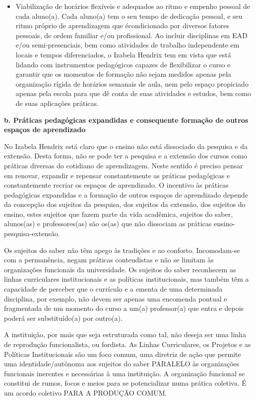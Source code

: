 \documentclass[a4paper, 12pt, openright, oneside, german, french, english, brazil]{abntex2}
\begin{document}
\begin{itemize}
\item Viabilização de horários flexíveis e adequados ao ritmo e empenho pessoal de cada aluno(a). Cada aluno(a) tem o seu tempo de dedicação pessoal, e seu ritmo próprio de aprendizagem que écondicionado por diversos fatores pessoais, de ordem familiar e/ou profissional. Ao incluir disciplinas em EAD e/ou semi-presenciais, bem como atividades de trabalho independente em locais e tempos diferenciados, o Izabela Hendrix tem em vista que está lidando com instrumentos pedagógicos capazes de flexibilizar o curso e garantir que os momentos de formação não sejam medidos apenas pela organização rígida de horários semanais de aula, nem pelo espaço propiciado apenas pela escola para que dê conta de suas atividades e estudos, bem como de suas aplicações práticas.
\end{itemize}

\vspace{5mm}

\textbf{b. Práticas pedagógicas expandidas e consequente formação de outros espaços de aprendizado}

No Izabela Hendrix está claro que o ensino não está dissociado da pesquisa e da extensão. Desta forma, não se pode ter a pesquisa e a extensão dos cursos como práticas diversas do cotidiano de aprendizagem. Neste sentido é preciso pensar em renovar, expandir e repensar constantemente as práticas pedagógicas e constantemente recriar os espaços de aprendizado. O incentivo às práticas pedagógicas expandidas e a formação de outros espaços de aprendizado depende da concepção dos sujeitos da pesquisa, dos sujeitos da extensão, dos sujeitos do ensino, estes sujeitos que fazem parte da vida acadêmica, sujeitos do saber, alunos(as) e professores(as) são os(as) que não dissociam as práticas ensino-pesquisa-extensão.

Os sujeitos do saber não têm apego às tradições e ao conforto. Incomodam-se com a permanência, negam práticas conteudistas e não se limitam às organizações funcionais da universidade. Os sujeitos do saber reconhecem as linhas curriculares institucionais e as políticas institucionais, mas também têm a capacidade de perceber que o currículo e a ementa de uma determinada disciplina, por exemplo, não devem ser apenas uma encomenda pontual e fragmentada de um momento do curso a um(a) professor(a) que entra e depois poderá ser substituído(a) por outro(a).

A instituição, por mais que seja estruturada como tal, não deseja ser uma linha de reprodução funcionalista, ou fordista. As Linhas Curriculares, os Projetos e as Políticas Institucionais são um foco comum, uma diretriz de ação que permite uma identidade/autônoma aos sujeitos do saber PARALELO às organizações funcionais inerentes e necessárias à uma instituição. A organização funcional se constitui de rumos, focos e meios para se potencializar numa prática coletiva. É um acordo coletivo PARA A PRODUÇÃO COMUM.
\end{document}

